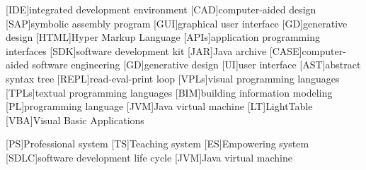 
% 
% 

\begin{acronym}

[IDE]{integrated development environment}
[CAD]{computer-aided design}
[SAP]{symbolic assembly program}
[GUI]{graphical user interface}
[GD]{generative design}
[HTML]{Hyper Markup Language}
[APIs]{application programming interfaces}
[SDK]{software development kit}
[JAR]{Java archive}
[CASE]{computer-aided software engineering}
[GD]{generative design}
[UI]{user interface}
[AST]{abstract syntax tree}
[REPL]{read-eval-print loop}
[VPLs]{visual programming languages}
[TPLs]{textual programming languages}
[BIM]{building information modeling}
[PL]{programming language}
[JVM]{Java virtual machine}
[LT]{LightTable}
[VBA]{Visual Basic Applications}

[PS]{Professional system}
[TS]{Teaching system}
[ES]{Empowering system}
[SDLC]{software development life cycle}
[JVM]{Java virtual machine}
\end{acronym}